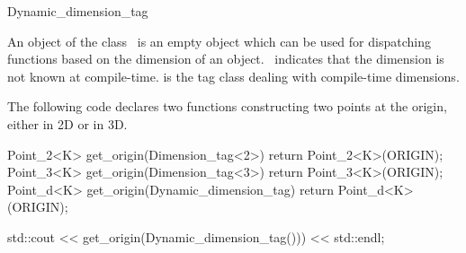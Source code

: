 \begin{ccRefClass} {Dynamic_dimension_tag}

\ccDefinition
An object of the class \ccRefName\ is an empty object which can be used
for dispatching functions based on the dimension of an object.
\ccRefName\ indicates that the dimension is not known at compile-time.
 is the tag class dealing with compile-time dimensions.


\ccExample

The following code declares two functions constructing two points at the origin,
either in 2D or in 3D.

\begin{cprog}
  Point_2<K> get_origin(Dimension_tag<2>) { return Point_2<K>(ORIGIN); }
  Point_3<K> get_origin(Dimension_tag<3>) { return Point_3<K>(ORIGIN); }
  Point_d<K> get_origin(Dynamic_dimension_tag) { return Point_d<K>(ORIGIN); }

  std::cout << get_origin(Dynamic_dimension_tag())) << std::endl;
\end{cprog}

\ccSeeAlso
{} \\
 \\

\end{ccRefClass}
